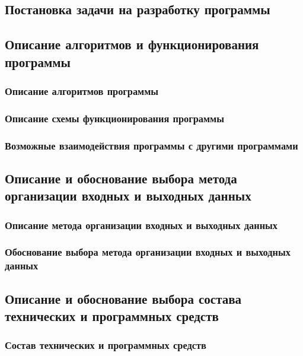 \documentclass[a4paper,12pt]{article}
\begin{document}
    \subsection{Постановка задачи на разработку программы}

    \subsection{Описание алгоритмов и функционирования программы}

    \subsubsection{Описание алгоритмов программы}

    \subsubsection{Описание схемы функционирования программы}

    \subsubsection{Возможные взаимодействия программы с другими программами}

    \subsection{Описание и обоснование выбора метода организации входных и выходных данных}

    \subsubsection{Описание метода организации входных и выходных данных}

    \subsubsection{Обоснование выбора метода организации входных и выходных данных}

    \subsection{Описание и обоснование выбора состава технических и программных средств}

    \subsubsection{Состав технических и программных средств}
\end{document}
